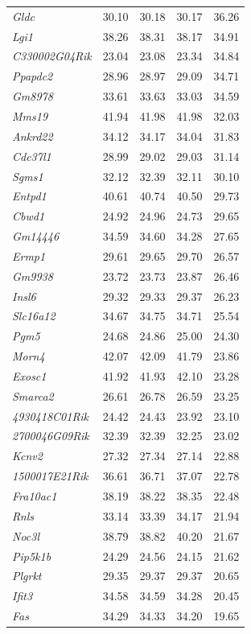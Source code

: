 \documentclass{article}
\begin{document}
\begin{table}[ht]
\begin{tabular}{>{\em}lrrrr}
  Gldc & 30.10 & 30.18 & 30.17 & 36.26 \\ 
  Lgi1 & 38.26 & 38.31 & 38.17 & 34.91 \\ 
  C330002G04Rik & 23.04 & 23.08 & 23.34 & 34.84 \\ 
  Ppapdc2 & 28.96 & 28.97 & 29.09 & 34.71 \\ 
  Gm8978 & 33.61 & 33.63 & 33.03 & 34.59 \\ 
  Mms19 & 41.94 & 41.98 & 41.98 & 32.03 \\ 
  Ankrd22 & 34.12 & 34.17 & 34.04 & 31.83 \\ 
  Cdc37l1 & 28.99 & 29.02 & 29.03 & 31.14 \\ 
  Sgms1 & 32.12 & 32.39 & 32.11 & 30.10 \\ 
  Entpd1 & 40.61 & 40.74 & 40.50 & 29.73 \\ 
  Cbwd1 & 24.92 & 24.96 & 24.73 & 29.65 \\ 
  Gm14446 & 34.59 & 34.60 & 34.28 & 27.65 \\ 
  Ermp1 & 29.61 & 29.65 & 29.70 & 26.57 \\ 
  Gm9938 & 23.72 & 23.73 & 23.87 & 26.46 \\ 
  Insl6 & 29.32 & 29.33 & 29.37 & 26.23 \\ 
  Slc16a12 & 34.67 & 34.75 & 34.71 & 25.54 \\ 
  Pgm5 & 24.68 & 24.86 & 25.00 & 24.30 \\ 
  Morn4 & 42.07 & 42.09 & 41.79 & 23.86 \\ 
  Exosc1 & 41.92 & 41.93 & 42.10 & 23.28 \\ 
  Smarca2 & 26.61 & 26.78 & 26.59 & 23.25 \\ 
  4930418C01Rik & 24.42 & 24.43 & 23.92 & 23.10 \\ 
  2700046G09Rik & 32.39 & 32.39 & 32.25 & 23.02 \\ 
  Kcnv2 & 27.32 & 27.34 & 27.14 & 22.88 \\ 
  1500017E21Rik & 36.61 & 36.71 & 37.07 & 22.78 \\ 
  Fra10ac1 & 38.19 & 38.22 & 38.35 & 22.48 \\ 
  Rnls & 33.14 & 33.39 & 34.17 & 21.94 \\ 
  Noc3l & 38.79 & 38.82 & 40.20 & 21.67 \\ 
  Pip5k1b & 24.29 & 24.56 & 24.15 & 21.62 \\ 
  Plgrkt & 29.35 & 29.37 & 29.37 & 20.65 \\ 
  Ifit3 & 34.58 & 34.59 & 34.28 & 20.45 \\ 
  Fas & 34.29 & 34.33 & 34.20 & 19.65 \\ 

\end{tabular}
\end{table}
\end{document}
